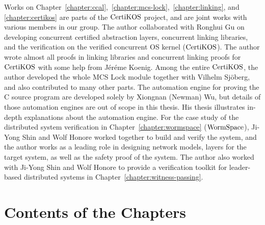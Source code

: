 Works on Chapter~\ref{chapter:ccal},~\ref{chapter:mcs-lock},~\ref{chapter:linking}, and \ref{chapter:certikos} are parts of 
the $\mathrm{CertiKOS}$ project, and are joint works with various members in our group. 
The author collaborated with Ronghui Gu on developing concurrent certified abstraction layers, concurrent linking libraries, and the verification on the verified concurrent OS kernel ($\mathrm{CertiKOS}$).  
The author wrote almost all proofs in linking libraries and concurrent linking proofs for $\mathrm{CertiKOS}$ with some help from 
J{\'e}r{\'e}me Koenig.
Among the entire $\mathrm{CertiKOS}$, 
the author developed the whole MCS Lock module together with Vilhelm Sj{\"o}berg,
and also contributed to many other parts. 
The automation engine for proving the C source program are developed solely by Xiongnan (Newman) Wu, but details of those automation engines are out of scope in this thesis. His thesis illustrates in-depth explanations about the automation engine. 
For the case study of the distributed system verification in Chapter~\ref{chapter:wormspace} ($\mathrm{WormSpace}$), Ji-Yong Shin and Wolf Honore worked together to build and verify the system, and the author works as a leading role in designing network models, layers for the target system, 
as well as the safety proof of the system. 
The author also worked with  Ji-Yong Shin and Wolf Honore to provide a verification toolkit for leader-based distributed systems in Chapter~\ref{chapter:witness-passing}.

\section{Contents of the Chapters}
\label{chapter:introduction:sec:contents-of-the-chapters}

